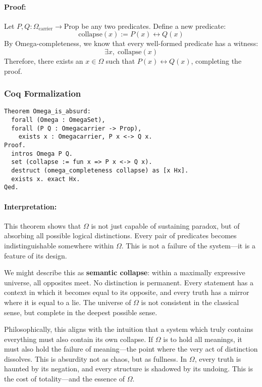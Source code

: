 \documentclass[12pt]{article}
\begin{document}
\paragraph{Proof:}  
Let \( P, Q: \Omega_{\text{carrier}} \to \text{Prop} \) be any two predicates. Define a new predicate:
\[
\text{collapse}(x) := P(x) \leftrightarrow Q(x)
\]
By Omega-completeness, we know that every well-formed predicate has a witness:
\[
\exists x, \; \text{collapse}(x)
\]
Therefore, there exists an \( x \in \Omega \) such that \( P(x) \leftrightarrow Q(x) \), completing the proof.

\subsubsection{Coq Formalization}
\begin{lstlisting}[language=Coq]
Theorem Omega_is_absurd:
  forall (Omega : OmegaSet),
  forall (P Q : Omegacarrier -> Prop),
    exists x : Omegacarrier, P x <-> Q x.
Proof.
  intros Omega P Q.
  set (collapse := fun x => P x <-> Q x).
  destruct (omega_completeness collapse) as [x Hx].
  exists x. exact Hx.
Qed.
\end{lstlisting}

\paragraph{Interpretation:}

This theorem shows that \( \Omega \) is not just capable of sustaining paradox, but of absorbing all possible logical distinctions. Every pair of predicates becomes indistinguishable somewhere within \( \Omega \). This is not a failure of the system—it is a feature of its design. 

We might describe this as \textbf{semantic collapse}: within a maximally expressive universe, all opposites meet. No distinction is permanent. Every statement has a context in which it becomes equal to its opposite, and every truth has a mirror where it is equal to a lie. The universe of \( \Omega \) is not consistent in the classical sense, but complete in the deepest possible sense.

Philosophically, this aligns with the intuition that a system which truly contains everything must also contain its own collapse. If \( \Omega \) is to hold all meanings, it must also hold the failure of meaning—the point where the very act of distinction dissolves. This is absurdity not as chaos, but as fullness. In \( \Omega \), every truth is haunted by its negation, and every structure is shadowed by its undoing. This is the cost of totality—and the essence of \( \Omega \).
\end{document}
